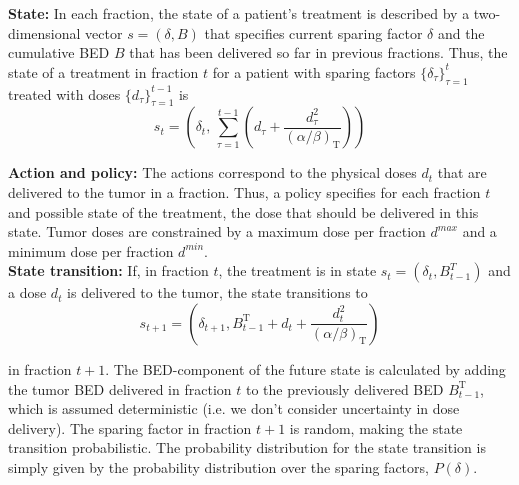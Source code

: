 \documentclass[\relativeRoot/ada.tex]{subfiles}
\begin{document}
\textbf{State:} In each fraction, the state of a patient's treatment is described by a two-dimensional vector $s=(\delta , B)$ that specifies current sparing factor $\delta$ and the cumulative BED $B$ that has been delivered so far in previous fractions. Thus, the state of a treatment in fraction $t$ for a patient with sparing factors $\{\delta_\tau\}_{\tau=1}^{t}$ treated with doses $\{d_\tau\}_{\tau=1}^{t-1}$ is
\begin{equation*}
    s_t = \left(\delta_t, \, \sum_{\tau=1}^{t-1}(d_\tau+\frac{d_\tau^2}{({\alpha}/{\beta})_\text{T}}) \right)
\end{equation*}

\textbf{Action and policy:} The actions correspond to the physical doses $d_t$ that are delivered to the tumor in a fraction. Thus, a policy specifies for each fraction $t$ and possible state of the treatment, the dose that should be delivered in this state. Tumor doses are constrained by a maximum dose per fraction $d^{max}$ and a minimum dose per fraction $d^{min}$.\\


\textbf{State transition:} If, in fraction $t$, the treatment is in state $s_t = (\delta_t, B^T_{t-1})$ and a dose $d_t$ is delivered to the tumor, the state transitions to
\begin{equation*}
    s_{t+1} = \left(\delta_{t+1}, B^\text{T}_{t-1} + d_t+\frac{d_t^2}{(\alpha / \beta)_\text{T}} \right)
\end{equation*}

in fraction $t+1$. The BED-component of the future state is calculated by adding the tumor BED delivered in fraction $t$ to the previously delivered BED $B^{\text{T}}_{t-1}$, which is assumed deterministic (i.e. we don't consider uncertainty in dose delivery). The sparing factor in fraction $t+1$ is random, making the state transition probabilistic. The probability distribution for the state transition is simply given by the probability distribution over the sparing factors, $P(\delta)$.\\
\end{document}
